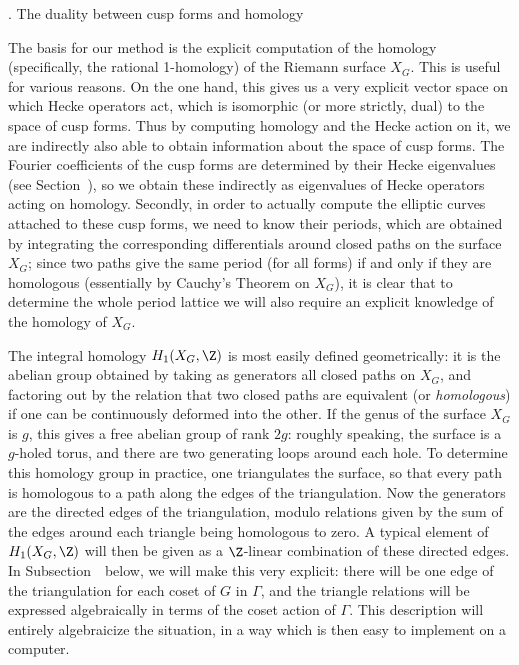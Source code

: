 \goodbreak
\beginsubsection{\dualcusphom}
\subhead \dualcusphom. The duality between cusp forms and homology \endsubhead
\nobreak

The basis for our method is the explicit computation of the homology
(specifically, the rational 1-homology) of the Riemann surface $X_G$.
This is useful for various reasons.  On the one hand, this gives us a
very explicit vector space on which Hecke operators act, which is
isomorphic (or more strictly, dual) to the space of cusp forms.  Thus
by computing homology and the Hecke action on it, we are indirectly
also able to obtain information about the space of cusp forms.  The
Fourier coefficients of the cusp forms are determined by their Hecke
eigenvalues (see Section~\Mcurves), so we obtain these indirectly as
eigenvalues of Hecke operators acting on homology.  Secondly, in order
to actually compute the elliptic curves attached to these cusp forms,
we need to know their periods, which are obtained by integrating the
corresponding differentials around closed paths on the surface $X_G$;
since two paths give the same period (for all forms) if and only if
they are homologous (essentially by Cauchy's Theorem on $X_G$), it is
clear that to determine the whole period lattice we will also require
an explicit knowledge of the homology of $X_G$.

The integral homology $H_1(X_G,\Z)$ is most easily defined
geometrically: it is the abelian group obtained by taking as
generators all closed paths on $X_G$, and factoring out by the
relation that two closed paths are equivalent (or {\it homologous\/})
if one can be continuously deformed into the other.  If the genus of
the surface $X_G$ is $g$, this gives a free abelian group of rank
$2g$: roughly speaking, the surface is a $g$-holed torus, and there
are two generating loops around each hole.  To determine this homology
group in practice, one triangulates the surface, so that every path is
homologous to a path along the edges of the triangulation.  Now the
generators are the directed edges of the triangulation, modulo
relations given by the sum of the edges around each triangle being
homologous to zero.  A typical element of $H_1(X_G,\Z)$ will then be
given as a $\Z$-linear combination of these directed edges.  In
Subsection~\triangles\ below, we will make this very explicit: there
will be one edge of the triangulation for each coset of $G$ in
$\Gamma$, and the triangle relations will be expressed algebraically
in terms of the coset action of $\Gamma$.  This description will
entirely algebraicize the situation, in a way which is then easy to
implement on a computer.

